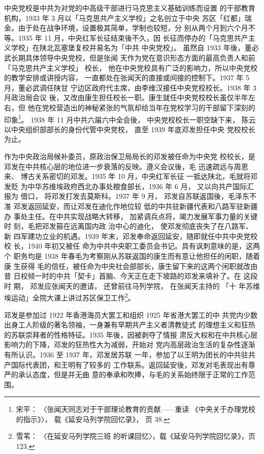 中央党校是中共为对党的中高级干部进行马克思主义基础训练而设置
的干部教育机构，1933 年 3 月以「马克思共产主义学校」之名创立于中央
苏区「红都」瑞金。由于处在战争环境，设置极其简单，学制也较短，分
别从两个月到六个月不等。1935 年 11 月，中央红军长征结束後不久，因
长征而停办的「马克思共产主义学校」在陕北瓦塞堡复校并易名为「中共
中央党校」。
虽然自 1933 年後，董必武长期具体领导中央党校，但是张闻
天作为党在意识形态方面的最高负责人和前
「马克思共产主义学校」
校长，
他在中央党校具有广泛的影响力，所以中央党校的教学安排或讲授内容，
一直都处在张闻天的直接或间接的控制下。1937 年 5 月，董必武调任陕甘
宁边区政府代主席，由李维汉接任中央党校校长。1938 年 3 月政治局会议
後，又改由康生担任校长一职。康生就任中央党校校长虽仅半年左右，但
他在党校营造出的神秘紧张的气氛却给当年在党校学习的干部留下深刻的
印象\footnote{宋平：
〈张闻天同志对于干部理论教育的贡献——重读
《中央关于办理党校的指示》〉， 载《延安马列学院回忆录》，
页 38.}。
1938 年 11 月中共六届六中全会後，
中央党校校长一职空缺下来，
陈云以中央组织部部长的身份代管中央党校，
直至 1939 年底邓发担任中央
党校校长为止。

作为中央政治局候补委员，原政治保卫局局长的邓发被任命为中央党 校校长，是
邓发在中共核心层的地位进一步衰落的反映。遵义会议後，毛 迅速疏远与周恩来、
博古关系密切的邓发。1935 年 10 月，中央红军长征 一抵达陕北，毛就将邓发贬
为中华苏维埃政府西北办事处粮食部长，1936 年 6 月， 又以向共产国际汇报为
借口， 将邓发打发去莫斯科。1937 年 9 月， 邓发自苏联返国後，毛泽东不准
邓发返回延安，而让邓发在迪化作地位较 低的中共驻新疆代表和八路军驻新疆办
事处主任。在中共实现战略大转移， 加紧调兵点将，竭力发展军事力量的关键时
刻，毛把邓发箍在远离国内政 治中心的迪化， 使邓发彻底丧失了在八路军、 新
四军建功立业的机遇。1939 年末，邓发奉命返回延安，随即就任中共中央党校校
长，1940 年初又被任 命为中共中央职工委员会书记。具有讽刺意味的是，这两个
职务均是 1938 年春毛为考察刚从苏联返国的康生而有意让他担任的闲职，随着康
生获得 毛的信任，被任命为中央社会部部长，康生留下来的这两个闲职就改由昔
日权倾一时的中共「契卡」首脑、今天正在走下坡路的邓发来填补了。在 这段时
期， 邓发应张闻天的邀请， 还曾前往马列学院， 在张闻天主持的 「十 年苏维
埃运动」全院大课上讲过苏区保卫工作\footnote{雪苇： 〈在延安马列学院三班
的听课回忆〉，载《延安马列学院回忆录》，页 123.}。

邓发是参加过 1922 年香港海员大罢工和组织 1925 年省港大罢工的中
共党内少数出身工人阶级的著名领袖，一身兼有早期共产主义者清教徒式
的理想主义和狂热的苏联崇拜者的性格特征。1935 年後，因被剥夺了情报
肃反大权和在中共核心层影响力的下降，邓发的狂热性大为减弱，开始对
党内高层政治生活的复杂性逐渐有所认识。1936 至 1937 年，邓发居苏联
一年，参加了以王明为团长的中共驻共产国际代表团，和王明有了较多的
工作联系。返回延安後，邓发对毛表现出有尊严的承认态度，但是并无曲
意的奉承和吹捧，与毛的关系始终限于正常的工作范围。

